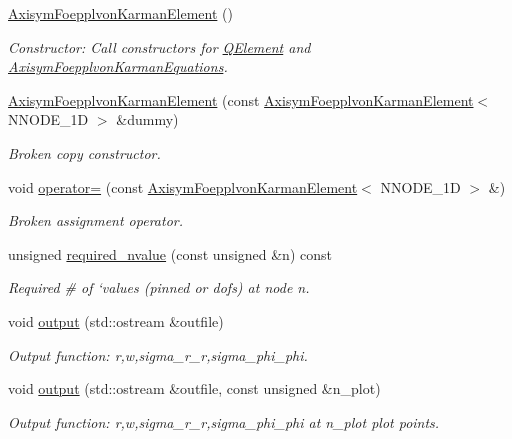 \begin{DoxyCompactItemize}
\hyperlink{classoomph_1_1AxisymFoepplvonKarmanElement_ae05df596899638a8ee2800266412d163}{Axisym\+Foepplvon\+Karman\+Element} ()
\begin{DoxyCompactList}\small\item\em Constructor\+: Call constructors for \hyperlink{classoomph_1_1QElement}{Q\+Element} and \hyperlink{classoomph_1_1AxisymFoepplvonKarmanEquations}{Axisym\+Foepplvon\+Karman\+Equations}. \end{DoxyCompactList}\item 
\hyperlink{classoomph_1_1AxisymFoepplvonKarmanElement_a3258341718feafc5196b85594911fd19}{Axisym\+Foepplvon\+Karman\+Element} (const \hyperlink{classoomph_1_1AxisymFoepplvonKarmanElement}{Axisym\+Foepplvon\+Karman\+Element}$<$ N\+N\+O\+D\+E\+\_\+1D $>$ \&dummy)
\begin{DoxyCompactList}\small\item\em Broken copy constructor. \end{DoxyCompactList}\item 
void \hyperlink{classoomph_1_1AxisymFoepplvonKarmanElement_a2fc69c8a64430a00d344eb55562ab8f2}{operator=} (const \hyperlink{classoomph_1_1AxisymFoepplvonKarmanElement}{Axisym\+Foepplvon\+Karman\+Element}$<$ N\+N\+O\+D\+E\+\_\+1D $>$ \&)
\begin{DoxyCompactList}\small\item\em Broken assignment operator. \end{DoxyCompactList}\item 
unsigned \hyperlink{classoomph_1_1AxisymFoepplvonKarmanElement_ab481ef11edd5211f38bb6e9936d2351f}{required\+\_\+nvalue} (const unsigned \&n) const
\begin{DoxyCompactList}\small\item\em Required \# of `values\textquotesingle{} (pinned or dofs) at node n. \end{DoxyCompactList}\item 
void \hyperlink{classoomph_1_1AxisymFoepplvonKarmanElement_a76cf09e19fc810a96251a64572248f76}{output} (std\+::ostream \&outfile)
\begin{DoxyCompactList}\small\item\em Output function\+: r,w,sigma\+\_\+r\+\_\+r,sigma\+\_\+phi\+\_\+phi. \end{DoxyCompactList}\item 
void \hyperlink{classoomph_1_1AxisymFoepplvonKarmanElement_a435aab946dfcaa0b23e7df59e9bc3933}{output} (std\+::ostream \&outfile, const unsigned \&n\+\_\+plot)
\begin{DoxyCompactList}\small\item\em Output function\+: r,w,sigma\+\_\+r\+\_\+r,sigma\+\_\+phi\+\_\+phi at n\+\_\+plot plot points. \end{DoxyCompactList}\item 

\end{DoxyCompactItemize}
